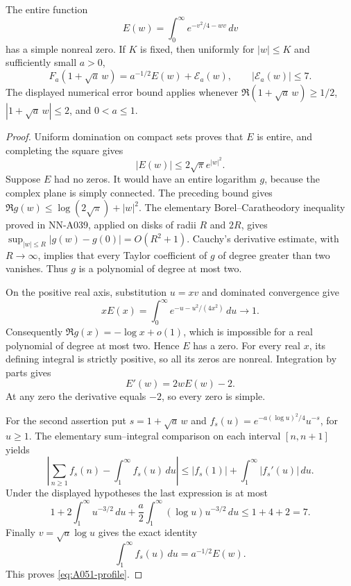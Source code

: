 \begin{lemma}
\label{lem:A051-profile}
The entire function
\[
              E(w)=\int_0^\infty e^{-v^2/4-wv}\,dv
\]
has a simple nonreal zero. If \(K\) is fixed, then uniformly for
\(|w|\le K\) and sufficiently small \(a>0\),
\begin{equation}\label{eq:A051-profile}
       F_a(1+\sqrt a\,w)=a^{-1/2}E(w)+\mathcal E_a(w),
              \qquad |\mathcal E_a(w)|\le7.
\end{equation}
The displayed numerical error bound applies whenever
\(\Re(1+\sqrt a\,w)\ge1/2\),
\(|1+\sqrt a\,w|\le2\), and \(0<a\le1\).
\end{lemma}

\begin{proof}
Uniform domination on compact sets proves that \(E\) is entire, and
completing the square gives
\[
             |E(w)|\le2\sqrt\pi e^{|w|^2}.
\]
Suppose \(E\) had no zeros. It would have an entire logarithm \(g\),
because the complex plane is simply connected. The preceding bound
gives \(\Re g(w)\le\log(2\sqrt\pi)+|w|^2\).
The elementary Borel--Caratheodory inequality proved in NN-A039,
applied on disks of radii \(R\) and \(2R\), gives
\(\sup_{|w|\le R}|g(w)-g(0)|=O(R^2+1)\).
Cauchy's derivative estimate, with \(R\to\infty\), implies that
every Taylor coefficient of \(g\) of degree greater than two vanishes.
Thus \(g\) is a polynomial of degree at most two.

On the positive real axis, substitution \(u=xv\) and dominated
convergence give
\[
 xE(x)=\int_0^\infty e^{-u-u^2/(4x^2)}\,du\longrightarrow1.
\]
Consequently \(\Re g(x)=-\log x+o(1)\), which is impossible for a
real polynomial of degree at most two. Hence \(E\) has a zero.
For every real \(x\), its defining integral is strictly positive,
so all its zeros are nonreal. Integration by parts gives
\[
                         E'(w)=2wE(w)-2.
\]
At any zero the derivative equals \(-2\), so every zero is simple.

For the second assertion put
\(s=1+\sqrt a\,w\) and
\(f_s(u)=e^{-a(\log u)^2/4}u^{-s}\), for \(u\ge1\).
The elementary sum--integral comparison on each interval
\([n,n+1]\) yields
\[
 \left|\sum_{n\ge1}f_s(n)-\int_1^\infty f_s(u)\,du\right|
       \le |f_s(1)|+\int_1^\infty|f_s'(u)|\,du.
\]
Under the displayed hypotheses the last expression is at most
\[
 1+2\int_1^\infty u^{-3/2}\,du
      +\frac a2\int_1^\infty(\log u)u^{-3/2}\,du
             \le1+4+2=7.
\]
Finally \(v=\sqrt a\log u\) gives the exact identity
\[
             \int_1^\infty f_s(u)\,du=a^{-1/2}E(w).
\]
This proves \eqref{eq:A051-profile}.
\end{proof}

